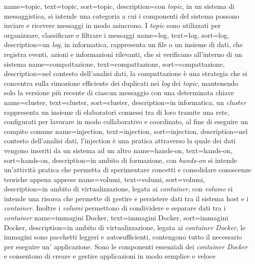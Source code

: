 {
    name={topic},
    text=topic,
    sort=topic,
    description={con \textit{topic}, in un sistema di messaggistica, si intende una categoria a cui i componenti del sistema possono inviare e 
    ricevere messaggi in modo asincrono. I \textit{topic} sono utilizzati per organizzare, classificare e filtrare i messaggi}
}
{
    name={log},
    text=log,
    sort=log,
    description={un \textit{log}, in informatica, rappresenta un file o un insieme di dati, che registra eventi, azioni e informazioni rilevanti, 
    che si verificano all'interno di un sistema}
}
{
    name={compattazione},
    text=compattazione,
    sort=compattazione,
    description={nel contesto dell'analisi dati, la compattazione è una strategia che si concentra sulla rimozione efficiente dei duplicati nei \textit{log} dei \textit{topic}, mantenendo solo la versione più recente di ciascun messaggio con una determinata chiave}
}
{
    name={cluster},
    text=cluster,
    sort=cluster,
    description={in informatica, un \textit{cluster} rappresenta un insieme di elaboratori connessi tra di loro tramite una rete, configurati 
    per lavorare in modo collaborativo e coordinato, al fine di eseguire un compito comune}
}
{
    name={injection},
    text=injection,
    sort=injection,
    description={nel contesto dell'analisi dati, l'injection è  una pratica attraverso la quale dei dati 
    vengono inseriti da un sistema ad un altro}
}
{
    name={hands-on},
    text=hands-on,
    sort=hands-on,
    description={in ambito di formazione, con \textit{hands-on} si intende un'attività pratica che permetta di sperimentare 
    concetti e consolidare conoscenze teoriche appena apprese}
}
{
    name={volumi},
    text=volumi,
    sort=volumi,
    description={in ambito di virtualizzazione, legata ai \textit{container}, con \textit{volume} si intende una risorsa che permette di gestire 
    e persistere dati tra il sistema host e i \textit{container}. Inoltre i \textit{volumi} permettono di condividere e separare 
    dati tra i \textit{container}}
}
{
    name={immagini Docker},
    text=immagini Docker,
    sort=immagini Docker,
    description={in ambito di virtualizzazione, legata ai \textit{container Docker}, le immagini sono pacchetti leggeri e autosufficienti,
    contengono tutto il necessario per eseguire un' applicazione. Sono le componenti essenziali dei \textit{container Docker} e consentono di 
    creare e gestire applicazioni in modo semplice e veloce}
}
